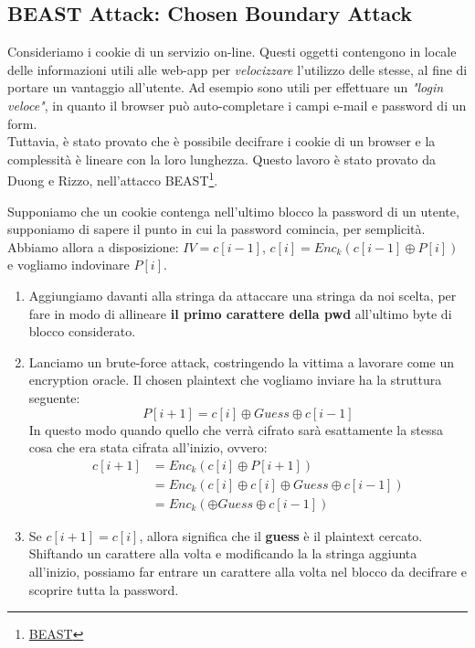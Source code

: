 \subsection{BEAST Attack: Chosen Boundary Attack}
Consideriamo i cookie di un servizio on-line. Questi oggetti contengono in locale delle informazioni utili alle web-app per \textit{velocizzare} l'utilizzo delle stesse, al fine di portare un vantaggio all'utente. Ad esempio sono utili per effettuare un \textit{"login veloce"}, in quanto il browser può auto-completare i campi e-mail e password di un form.\\
Tuttavia, è stato provato che è possibile decifrare i cookie di un browser e la complessità è lineare con la loro lunghezza. Questo lavoro è stato provato da Duong e Rizzo, nell'attacco BEAST\footnote{\href{https://bug665814.bmoattachments.org/attachment.cgi?id=540839}{BEAST}}.
\pagebreak
\begin{definition}\label{def:beastatk}
Supponiamo che un cookie contenga nell'ultimo blocco la password di un utente, supponiamo di sapere il punto in cui la password comincia, per semplicità\footnotemark. Abbiamo allora a disposizione: $IV=c[i-1]$, $c[i]=Enc_k(c[i-1]\oplus{P[i]})$ e vogliamo indovinare $P[i]$.
\begin{enumerate}
    \item Aggiungiamo davanti alla stringa da attaccare una stringa da noi scelta, per fare in modo di allineare \textbf{il primo carattere della pwd} all'ultimo byte di blocco considerato.
    \item Lanciamo un brute-force attack, costringendo la vittima a lavorare come un encryption oracle. Il chosen plaintext che vogliamo inviare ha la struttura seguente:
    \begin{equation}\label{eq:beastcpa}
        P[i+1] = c[i]\oplus{Guess}\oplus{c[i-1]}
    \end{equation}
    In questo modo quando quello che verrà cifrato sarà esattamente la stessa cosa che era stata cifrata all'inizio, ovvero: 
    \begin{equation}
    \begin{aligned}
        c[i+1]&=Enc_k(c[i]\oplus{P[i+1]})\\
        &=Enc_k(c[i]\oplus{c[i]\oplus{Guess}\oplus{c[i-1]}})\\
        &=Enc_k(\oplus{Guess}\oplus{c[i-1]})
    \end{aligned}
\end{equation}
    \item Se $c[i+1]=c[i]$, allora significa che il \textbf{guess} è il plaintext cercato. Shiftando un carattere alla volta e modificando la la stringa aggiunta all'inizio, possiamo far entrare un carattere alla volta nel blocco da decifrare e scoprire tutta la password.
\end{enumerate}
\end{definition}
